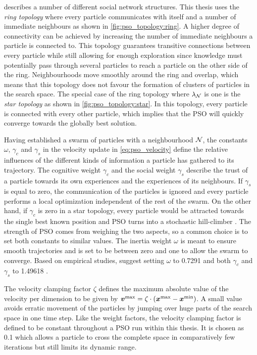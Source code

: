 \citeauthor{engelbrecht_fundamentals_2006} describes a number of different social network structures.
This thesis uses the \emph{ring topology} where every particle communicates with itself and a number of immediate neighbours as shown in \cref{fig:pso_topology:ring}.
A higher degree of connectivity can be achieved by increasing the number of immediate neighbours a particle is connected to.
This topology guarantees transitive connections between every particle while still allowing for enough exploration since knowledge must potentially pass through several particles to reach a particle on the other side of the ring.
Neighbourhoods move smoothly around the ring and overlap, which means that this topology does not favour the formation of clusters of particles in the search space.
The special case of the ring topology where $\lambda_{\operatorname{\mathcal{N}}}$ is one is the \emph{star topology} as shown in \cref{fig:pso_topology:star}.
In this topology, every particle is connected with every other particle, which implies that the PSO will quickly converge towards the globally best solution.

Having established a swarm of particles with a neighbourhood $\operatorname{\mathcal{N}}$, the constants $\omega$, $\gamma_c$ and $\gamma_s$ in the velocity update in \cref{eq:pso_velocity} define the relative influences of the different kinds of information a particle has gathered to its trajectory.
The cognitive weight $\gamma_c$ and the social weight $\gamma_s$ describe the trust of a particle towards its own experiences and the experiences of its neighbours.
If $\gamma_s$ is equal to zero, the communication of the particles is ignored and every particle performs a local optimization independent of the rest of the swarm.
On the other hand, if $\gamma_c$ is zero in a star topology, every particle would be attracted towards the single best known position and PSO turns into a stochastic hill-climber \cite{engelbrecht_fundamentals_2006}.
The strength of PSO comes from weighing the two aspects, so a common choice is to set both constants to similar values.
The inertia weight $\omega$ is meant to ensure smooth trajectories and is set to be between zero and one to allow the swarm to converge.
Based on empirical studies, \citeauthor{eberhart_comparing_2000} suggest setting $\omega$ to 0.7291 and both $\gamma_c$ and $\gamma_s$ to 1.49618 \cite{eberhart_comparing_2000}.

The velocity clamping factor $\zeta$ defines the maximum absolute value of the velocity per dimension to be given by $\bm{v^\text{max}} = \zeta \cdot ( \bm{x^\text{max}} - \bm{x^\text{min}} )$.
A small value avoids erratic movement of the particles by jumping over huge parts of the search space in one time step.
Like the weight factors, the velocity clamping factor is defined to be constant throughout a PSO run within this thesis.
It is chosen as 0.1 which allows a particle to cross the complete space in comparatively few iterations but still limits its dynamic range.

